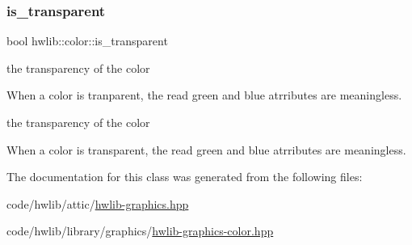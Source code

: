 \subsubsection{\texorpdfstring{is\+\_\+transparent}{is\_transparent}}
{\footnotesize\ttfamily bool hwlib\+::color\+::is\+\_\+transparent}



the transparency of the color 

When a color is tranparent, the read green and blue atrributes are meaningless.

the transparency of the color

When a color is transparent, the read green and blue atrributes are meaningless. 

The documentation for this class was generated from the following files\+:\begin{DoxyCompactItemize}
\item 
code/hwlib/attic/\hyperlink{hwlib-graphics_8hpp}{hwlib-\/graphics.\+hpp}\item 
code/hwlib/library/graphics/\hyperlink{hwlib-graphics-color_8hpp}{hwlib-\/graphics-\/color.\+hpp}\end{DoxyCompactItemize}
